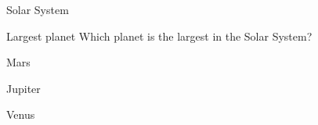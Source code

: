 \documentclass[12pt]{article}
\begin{document}
\begin{quiz}{Solar System}

\begin{multi}{Largest planet}
Which planet is the largest in the Solar System?
\item Mars
\item* Jupiter
\item Venus
\end{multi}

\end{quiz}
\end{document}
